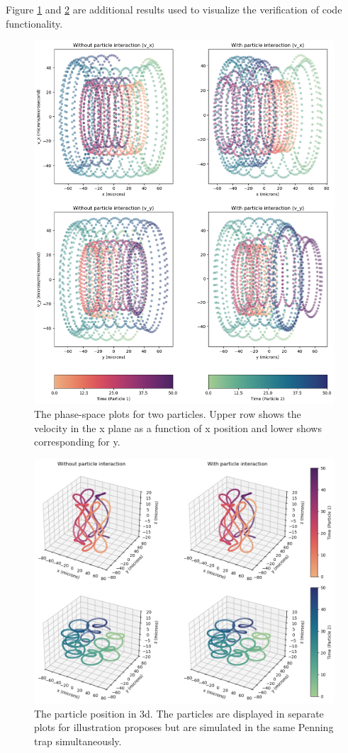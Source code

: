 \documentclass[12pt,a4paper,twocolumn]{article}
\begin{document}
Figure \ref{fig:phase-space} and \ref{fig:two_particles_3d} are additional results used to visualize the verification of code functionality. 

\begin{figure}[h!]
    \centering
    \includegraphics[width=.9\linewidth]{Project 3/figures/two_particles_v-vs-r.png}
    \caption{The phase-space plots for two particles. Upper row shows the velocity in the x plane as a function of x position and lower shows corresponding for y.}
    \label{fig:phase-space}
\end{figure}

\begin{figure}[h!]
    \centering
    \includegraphics[width=.9\linewidth]{Project 3/figures/two_particles_3d.png}
    \caption{The particle position in 3d. The particles are displayed in separate plots for illustration proposes but are simulated in the same Penning trap simultaneously. }
    \label{fig:two_particles_3d}
\end{figure}
\end{document}
